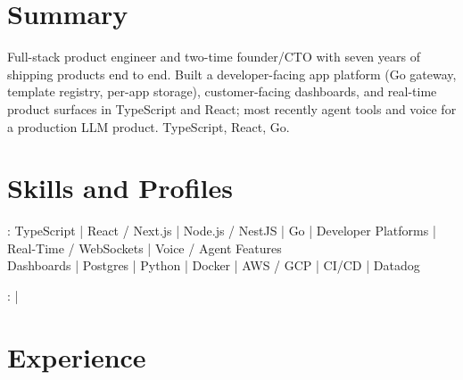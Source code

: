\documentclass[print]{jack-resume}
\begin{document}
\pagecolor{darkmodeBackground}


\begin{minipage}[t][1cm][t]{.03\textwidth}
    \hfill
\end{minipage}

\section{Summary}
Full-stack product engineer and two-time founder/CTO with seven years of shipping products end to end. Built a developer-facing app platform (Go gateway, template registry, per-app storage), customer-facing dashboards, and real-time product surfaces in TypeScript and React; most recently agent tools and voice for a production LLM product. TypeScript, React, Go.
\sectionsep

\section{Skills and Profiles}
:
TypeScript \hfill | \hfill
React / Next.js \hfill | \hfill
Node.js / NestJS \hfill | \hfill
Go \hfill | \hfill
Developer Platforms \hfill | \hfill
Real-Time / WebSockets \hfill | \hfill
Voice / Agent Features \\
\hspace{1.0cm} Dashboards \hfill | \hfill
Postgres \hfill | \hfill
Python \hfill | \hfill
Docker \hfill | \hfill
AWS / GCP \hfill | \hfill
CI/CD \hfill | \hfill
Datadog \\

\raggedright{
    :
      \href{https://www.linkedin.com/in/jack-sturtevant/}{ \ExternalLink} |
     \href{https://github.com/jacksturt}{ \ExternalLink}}

\section{Experience}
\end{document}
